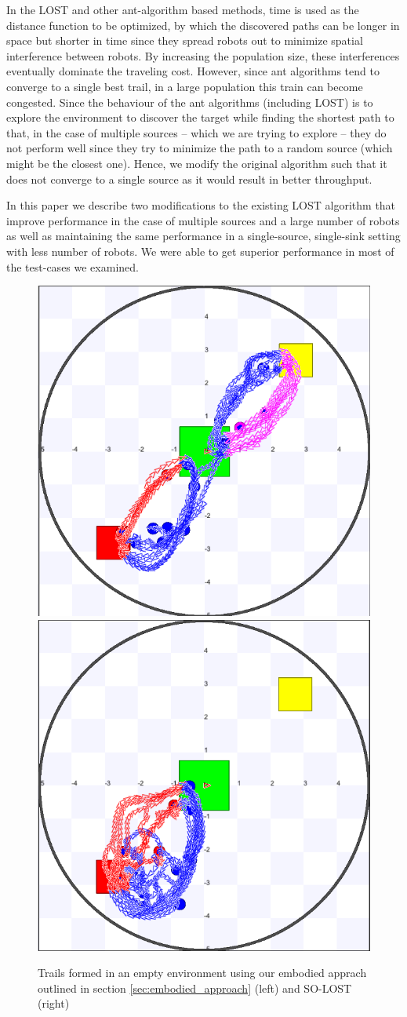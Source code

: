 \documentclass[letterpaper, 10 pt, conference]{ieeeconf}  %
\begin{document}
In the LOST and other ant-algorithm based methods, time is used as the distance function to be optimized, by which the discovered paths can be longer in space but shorter in time since they spread robots out to minimize spatial interference between robots. By increasing the population size, these interferences eventually dominate the traveling cost. However, since ant algorithms tend to converge to a single best trail, in a large population this train can become congested. Since the behaviour of the ant algorithms (including LOST) is to explore the environment to discover the target while finding the shortest path to that, in the case of multiple sources -- which we are trying to explore -- they do not perform well since they try to minimize the path to a random source (which might be the closest one). Hence, we modify the original algorithm such that it does not converge to a single source as it would result in better throughput.

In this paper we describe two modifications to the existing LOST algorithm that improve performance in the case of multiple sources and a large number of robots as well as maintaining the same performance in a single-source, single-sink setting with less number of robots. We were able to get superior performance in most of the test-cases we examined.

\begin{figure}
   \includegraphics[width=0.49\linewidth]{embodied.png}
   \includegraphics[width=0.49\linewidth]{SO_LOST.png}
   \centering
   \caption{Trails formed in an empty environment using our embodied apprach outlined in section \ref{sec:embodied_approach} (left) and SO-LOST (right)}
   \label{fig:grid_visualization}
\end{figure}
\end{document}
